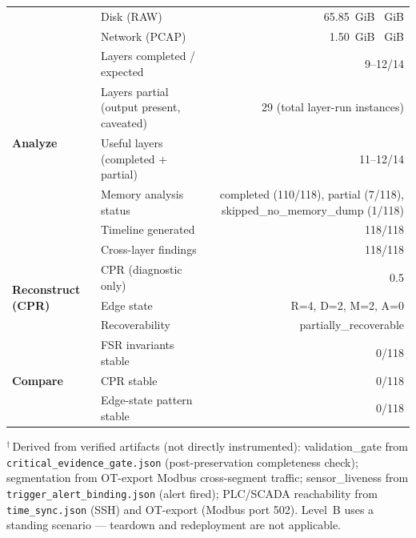 \begin{table}[ht]
\begin{tabular}{llr}
 & Disk (RAW) & 65.85~GiB \pm 12.96~GiB \\
 & Network (PCAP) & 1.50~GiB \pm 1.30~GiB \\
\hline
\multirow{5}{*}{\textbf{Analyze}} & Layers completed / expected & 9--12/14 \\
 & Layers partial (output present, caveated) & 29 (total layer-run instances) \\
 & Useful layers (completed + partial) & 11--12/14 \\
 & Memory analysis status & completed (110/118), partial (7/118), skipped_no_memory_dump (1/118) \\
 & Timeline generated & 118/118 \\
 & Cross-layer findings & 118/118 \\
\hline
\multirow{3}{*}{\textbf{Reconstruct (CPR)}} & CPR (diagnostic only) & 0.5 \\
 & Edge state & R=4, D=2, M=2, A=0 \\
 & Recoverability & partially_recoverable \\
\hline
\multirow{3}{*}{\textbf{Compare}} & FSR invariants stable & 0/118 \\
 & CPR stable & 0/118 \\
 & Edge-state pattern stable & 0/118 \\
\hline
\end{tabular}
\begin{flushleft}
\footnotesize $^{\dagger}$\,Derived from verified artifacts (not directly instrumented):
validation\_gate from \texttt{critical\_evidence\_gate.json} (post-preservation completeness check);
segmentation from OT-export Modbus cross-segment traffic;
sensor\_liveness from \texttt{trigger\_alert\_binding.json} (alert fired);
PLC/SCADA reachability from \texttt{time\_sync.json} (SSH) and OT-export (Modbus port 502).
Level~B uses a standing scenario --- teardown and redeployment are not applicable.
\end{flushleft}
\end{table}
